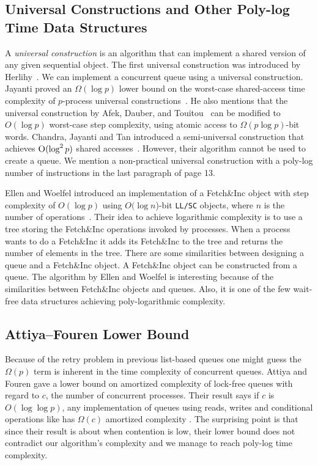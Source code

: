 \subsection{Universal Constructions and Other Poly-log Time Data Structures}
A \textit{universal construction} is an algorithm that can implement a
shared version of any given sequential object. The first universal
construction was introduced by
Herlihy~\cite{10.1145/114005.102808}. We can implement a concurrent
queue using a universal construction. Jayanti proved an $\Omega(\log
p)$ lower bound on the worst-case shared-access time complexity of
$p$-process universal
constructions~\cite{DBLP:conf/podc/Jayanti98a}. He also mentions that
the universal construction by Afek, Dauber, and
Touitou~\cite{DBLP:conf/stoc/AfekDT95} can be modified to $O(\log p)$
worst-case step complexity, using atomic access to $\Omega(p \log
p)$-bit words. Chandra, Jayanti and Tan introduced a semi-universal
construction that achieves $\textsc{O}(\log^2 p)$ shared
accesses~\cite{DBLP:conf/podc/ChandraJT98}. However, their algorithm
cannot be used to create a queue. We mention a non-practical universal
construction with a poly-log number of  instructions in the
last paragraph of page 13. 

Ellen and Woelfel introduced an implementation of a Fetch\&Inc object
with step complexity of $O(\log p)$ using $O(\log n$)-bit
\texttt{LL/SC} objects, where $n$ is the number of
operations~\cite{10.1007/978-3-642-41527-2_20}. Their idea to achieve
logarithmic complexity is to use a tree storing the Fetch\&Inc
operations invoked by processes. When a process wants to do a
Fetch\&Inc it adds its Fetch\&Inc to the tree and returns the number
of elements in the tree. There are some similarities between designing
a queue and a Fetch\&Inc object. A Fetch\&Inc object can be
constructed from a queue. The algorithm by Ellen and Woelfel is
interesting because of the similarities between Fetch\&Inc objects and
queues. Also, it is one of the few wait-free data structures achieving
poly-logarithmic complexity. 

\subsection{Attiya--Fouren Lower Bound}
Because of the  retry problem in previous list-based queues
one might guess the $\Omega(p)$ term is inherent in the time
complexity of concurrent queues. Attiya and Fouren gave a lower bound
on amortized complexity of lock-free queues with regard to $c$, the
number of concurrent processes. Their result says if $c$ is
$O(\log\log p)$, any implementation of queues using reads, writes and
conditional operations like  has $\Omega(c)$ amortized
complexity \cite{DBLP:conf/opodis/AttiyaF17}. The surprising point is
that since their result is about when contention is low, their lower
bound does not contradict our algorithm's complexity and we manage to
reach poly-log time complexity. 
